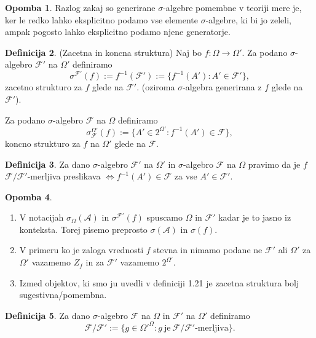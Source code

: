\documentclass[a4paper,12pt]{article}
\theoremstyle{definition} %
\newtheorem{definicija}{Definicija}[section]
\newtheorem{opomba}[definicija]{Opomba}
\theoremstyle{plain} %
\newcommand{\F}{\mathcal{F}}
\newcommand{\A}{\mathcal{A}}
\begin{document}
            \begin{opomba}
                Razlog zakaj so generirane $\sigma$-algebre pomembne v teoriji mere je, ker le redko lahko eksplicitno
                podamo vse elemente $\sigma$-algebre, ki bi jo zeleli, ampak pogosto lahko eksplicitno podamo njene generatorje.  
            \end{opomba}

            \begin{definicija}(Zacetna in koncna struktura)
                Naj bo $f:\Omega \rightarrow \Omega'$. Za podano $\sigma$-algebro $\F'$ na $\Omega'$  definiramo $$\sigma^{\F'}(f):= f^{-1}(\F'):=\{f^{-1}(A'):A' \in \F'\},$$
                zacetno strukturo za $f$ glede na $\F'$. (oziroma $\sigma$-algebra generirana z $f$ glede na $\F'$).

                Za podano $\sigma$-algebro $\F$ na $\Omega$ definiramo $$\sigma^{\Omega'}_{\F}(f):=\{A' \in 2^{\Omega'}: f^{-1}(A') \in \F\},$$
                koncno strukturo za $f$ na $\Omega'$ glede na $\F$.
            \end{definicija}

            \begin{definicija}
                Za dano $\sigma$-algebro $\F'$ na $\Omega'$ in $\sigma$-algebro $\F$ na $\Omega$ pravimo da je $f$ $\F/\F'$-merljiva preslikava $\iff f^{-1}(A')\in \F$ za vse $A' \in \F'$.
            \end{definicija}

            \begin{opomba}
                \begin{enumerate}
                    \item V notacijah $\sigma_\Omega(\A)$ in $\sigma^{\F'}(f)$ spuscamo $\Omega$ in $\F'$ kadar je to jasno iz konteksta. Torej pisemo preprosto $\sigma(\A)$ in $\sigma(f)$.
                    \item V primeru ko je zaloga vrednosti $f$ stevna in nimamo podane ne $\F'$ ali $\Omega'$ za $\Omega'$ vazamemo $Z_f$ in za $\F'$ vazamemo $2^{\Omega'}$.
                    \item Izmed objektov, ki smo ju uvedli v definiciji 1.21 je zacetna struktura bolj sugestivna/pomembna.
                \end{enumerate}
            \end{opomba}

            \begin{definicija}
                Za dano $\sigma$-algebro $\F$ na $\Omega$ in $\F'$ na $\Omega'$ definiramo $$\F/\F':= \{g \in \Omega'^\Omega: g \ \text{je} \ \F/\F'\text{-merljiva}\}.$$
            \end{definicija}
\end{document}
